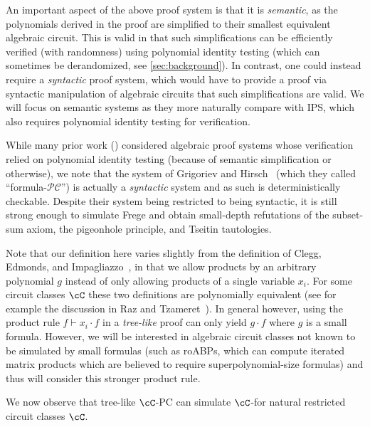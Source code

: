 \documentclass{toc}
\begin{document}
An important aspect of the above proof system is that it is \emph{semantic}, as the polynomials derived in the proof are simplified to their smallest equivalent algebraic circuit.  This is  valid in that such simplifications can be efficiently verified (with randomness) using polynomial identity testing (which can sometimes be derandomized, see \autoref{sec:background}). In contrast, one could instead require a \emph{syntactic} proof system, which would have to provide a proof via syntactic manipulation of algebraic circuits that such simplifications are valid.  We will focus on semantic systems as they more naturally compare with IPS, which also requires polynomial identity testing for verification.

While many prior work (\cite{Pitassi97,RazTzameret08a,RazTzameret08b,Tzameret11,DBLP:journals/jacm/GrochowP18}) considered algebraic proof systems whose verification relied on polynomial identity testing (because of semantic simplification or otherwise), we note that the system of Grigoriev and Hirsch~\cite{GrigorievHirsch03} (which they called ``formula-$\mathcal{PC}$'') is actually a \emph{syntactic} system and as such %
is deterministically checkable. Despite their system being restricted to being syntactic, it is still strong enough to simulate Frege and obtain small-depth refutations of the subset-sum axiom, the pigeonhole principle, and Tseitin tautologies.

\begin{remark}
  Note that our definition here varies slightly from the definition of Clegg, Edmonds, and Impagliazzo~\cite{CleggEI96}, in that we allow products by an arbitrary polynomial $g$ instead of only allowing products of a single variable $x_i$.  For some circuit classes $\cC$ these two definitions are polynomially equivalent (see for example the discussion in Raz and Tzameret~\cite{RazTzameret08a}).  In general however, using the product rule $f\vdash x_i\cdot f$ in a \emph{tree-like} proof can only yield $g\cdot f$ where $g$ is a small formula. However, we will be interested in algebraic circuit classes not known to be simulated by small formulas (such as roABPs, which can compute iterated matrix products which are believed to require superpolynomial-size formulas) and
thus %
will consider this stronger product rule.
\end{remark}

We now observe that tree-like $\cC$-PC can simulate $\cC$-\lIPS for natural restricted circuit classes $\cC$.
\end{document}
